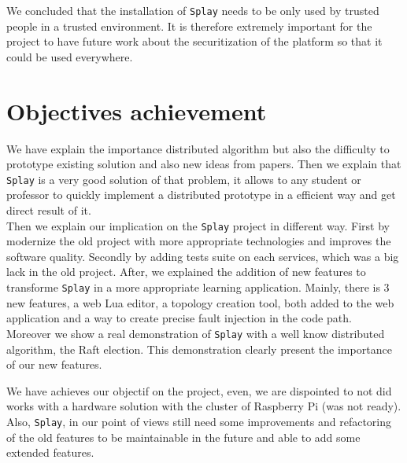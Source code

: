 \documentclass{eplmastersthesis}
\begin{document}
        We concluded that the installation of \texttt{Splay} needs to be only
        used by trusted people in a trusted environment. It is therefore
        extremely important for the project to have future work about the
        securitization of the platform so that it could be used everywhere.

    \section{Objectives achievement} %

      We have explain the importance distributed
      algorithm but also the difficulty to prototype existing solution and also new ideas
      from papers. Then we explain that \texttt{Splay} is a very good solution of that problem,
      it allows to any student or professor to quickly implement a
      distributed prototype in a efficient way and get direct result of it.\\

      Then we explain our implication on the \texttt{Splay} project in different way.
      First by modernize the old project with more appropriate
      technologies and improves the software quality. Secondly by adding
      tests suite on each services, which was a big lack in the old project.
      After, we explained the addition of new features to transforme \texttt{Splay}
      in a more appropriate learning application. Mainly, there is 3 new features,
      a web Lua editor, a topology creation tool, both added to the web application and
      a way to create precise fault injection in the code path. \\

      Moreover we show a real demonstration of \texttt{Splay} with a well know
      distributed algorithm, the Raft election. This demonstration
      clearly present the importance of our new features.

      We have achieves our objectif on the project, even, we are dispointed to not did
      works with a hardware solution with the cluster of Raspberry Pi (was not ready).
      Also, \texttt{Splay}, in our point of views still need some improvements and refactoring
      of the old features to be maintainable in the future and able to add
      some extended features.

  \nocite{*}
  
  

  \backcoverpage
\end{document}
